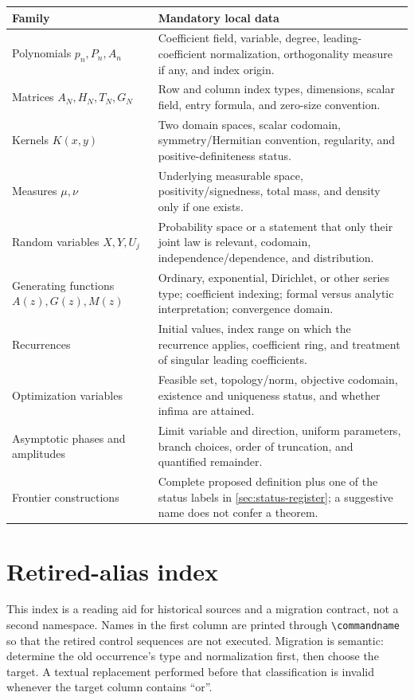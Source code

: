 \documentclass[11pt,oneside]{article}
\theoremstyle{definition}
\theoremstyle{remark}
\DeclareRobustCommand{\commandname}[1]{\texttt{\textbackslash#1}}
\begin{document}
\begin{longtable}{@{}p{}p{}@{}}
\toprule
Family & Mandatory local data\\
\midrule
\endhead
Polynomials $p_n,P_n,A_n$ & Coefficient field, variable, degree, leading-coefficient
normalization, orthogonality measure if any, and index origin.\\
Matrices $A_N,H_N,T_N,G_N$ & Row and column index types, dimensions, scalar field,
entry formula, and zero-size convention.\\
Kernels $K(x,y)$ & Two domain spaces, scalar codomain, symmetry/Hermitian convention,
regularity, and positive-definiteness status.\\
Measures $\mu,\nu$ & Underlying measurable space, positivity/signedness, total mass,
and density only if one exists.\\
Random variables $X,Y,U_j$ & Probability space or a statement that only their joint law
is relevant, codomain, independence/dependence, and distribution.\\
Generating functions $A(z),G(z),M(z)$ & Ordinary, exponential, Dirichlet, or other
series type; coefficient indexing; formal versus analytic interpretation; convergence
domain.\\
Recurrences & Initial values, index range on which the recurrence applies, coefficient
ring, and treatment of singular leading coefficients.\\
Optimization variables & Feasible set, topology/norm, objective codomain, existence and
uniqueness status, and whether infima are attained.\\
Asymptotic phases and amplitudes & Limit variable and direction, uniform parameters,
branch choices, order of truncation, and quantified remainder.\\
Frontier constructions & Complete proposed definition plus one of the status labels in
\cref{sec:status-register}; a suggestive name does not confer a theorem.\\
\bottomrule
\end{longtable}

\section{Retired-alias index}
\label{sec:retired-aliases}

This index is a reading aid for historical sources and a migration contract, not a second
namespace.  Names in the first column are printed through \commandname{commandname} so
that the retired control sequences are not executed.  Migration is semantic: determine
the old occurrence's type and normalization first, then choose the target.  A textual
replacement performed before that classification is invalid whenever the target column
contains ``or''.
\end{document}
